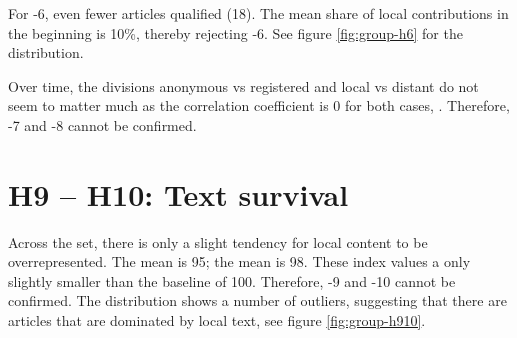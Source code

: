 For \hyp{6}, even fewer articles qualified (18).
The mean share of local contributions in the beginning is 10\%, thereby rejecting \hyp{6}.
See figure \ref{fig:group-h6} for the distribution.


Over time, the divisions anonymous vs registered and local vs distant do not seem to matter much as the correlation coefficient is 0 for both cases, .
Therefore, \hyp{7} and \hyp{8} cannot be confirmed.



\section{H9 -- H10: Text survival}

Across the set, there is only a slight tendency for local content to be overrepresented. 
The mean  is 95; the mean  is 98.
These index values a only slightly smaller than the baseline of 100.
Therefore, \hyp{9} and \hyp{10} cannot be confirmed.
The distribution shows a number of outliers, suggesting that there are articles that are dominated by local text, see figure \ref{fig:group-h910}.



